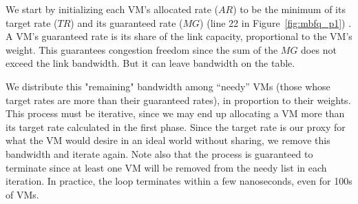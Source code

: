 We start by initializing each VM's allocated rate ($AR$) to be the minimum of its 
target rate ($TR$)
and its guaranteed rate ($MG$) (line 22  in Figure~\ref{fig:mbfq_p1}) .  A VM's
guaranteed rate is its share of the link capacity, proportional to the VM's weight.
This guarantees congestion freedom since the
sum of the $MG$ does not exceed the link bandwidth.  But it can leave bandwidth
on the table.

We distribute this "remaining" bandwidth among ``needy'' VMs (those whose target
rates are more than their guaranteed rates), in proportion to their weights.
This process must be iterative, since we may end up allocating a VM more than
its target rate calculated in the first phase.  Since the target rate is our
proxy for what the VM would desire in an ideal world without sharing, we remove
this bandwidth and iterate again.  Note also that the process is guaranteed to
terminate since at least one VM will be removed from the needy list in each
iteration. In practice, the loop terminates within a few nanoseconds, even for
100s of VMs.

